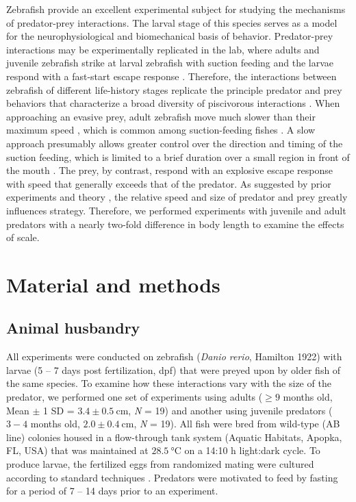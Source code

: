 \documentclass[]{rsos}%
\begin{document}
Zebrafish provide an excellent experimental subject for studying the mechanisms of predator-prey interactions. 
The larval stage of this species serves as a model for the neurophysiological \cite{Bianco:2015gm,Bagnall:2014iu,Huang:2013vj} and biomechanical \cite{Muller:2004hp,Li:2016cy} basis of behavior.
Predator-prey interactions may be experimentally replicated in the lab, where adults and juvenile zebrafish strike at larval zebrafish with suction feeding and the larvae respond with a fast-start escape response \cite{Stewart:2013bha}.
Therefore, the interactions between zebrafish of different life-history stages replicate the principle predator and prey behaviors that characterize a broad diversity of piscivorous interactions \cite{Weihs:1984tb,Walker:2005vn}. 
When approaching an evasive prey, adult zebrafish move much slower than their maximum speed \cite{Stewart:2013bha}, which is common among suction-feeding fishes \cite{Webb:1984jz,Higham:2007go}.
A slow approach presumably allows greater control over the direction and timing of the suction feeding, which is limited to a brief duration over a small region in front of the mouth \cite{Holzman:2008jc,Holzman:2009uu}. 
The prey, by contrast, respond with an explosive escape response with speed that generally exceeds that of the predator. 
As suggested by prior experiments \cite{Fuiman:1994td} and theory \cite{Weihs:1984tb}, the relative speed and size of predator and prey greatly influences strategy.
Therefore, we performed experiments with juvenile and adult predators with a nearly two-fold difference in body length to examine the effects of scale.


\section{Material and methods}

\subsection{Animal husbandry}
All experiments were conducted on zebrafish (\textit{Danio rerio}, Hamilton 1922) with larvae (5 -- 7 days post fertilization, dpf) that were preyed upon by older fish of the same species. 
To examine how these interactions vary with the size of the predator, we performed one set of experiments using adults ($\geq 9$ months old, Mean $\pm$ 1 SD = $3.4 \pm \SI{0.5}{\cm}$, \textit{N} = 19) and another using juvenile predators ($3-4$ months old, $2.0  \pm  \SI{0.4}{\cm}$, \textit{N} = 19).
All fish were bred from wild-type (AB line) colonies housed in a flow-through tank system (Aquatic Habitats, Apopka, FL, USA) that was maintained at $\SI{28.5}{\celsius}$ on a 14:10 h light:dark cycle. 
To produce larvae, the fertilized eggs from randomized mating were cultured according to standard techniques \cite{Westerfield:UXiBrEuA}.
Predators were motivated to feed by fasting for a period of 7 -- 14 days prior to an experiment.
\end{document}
